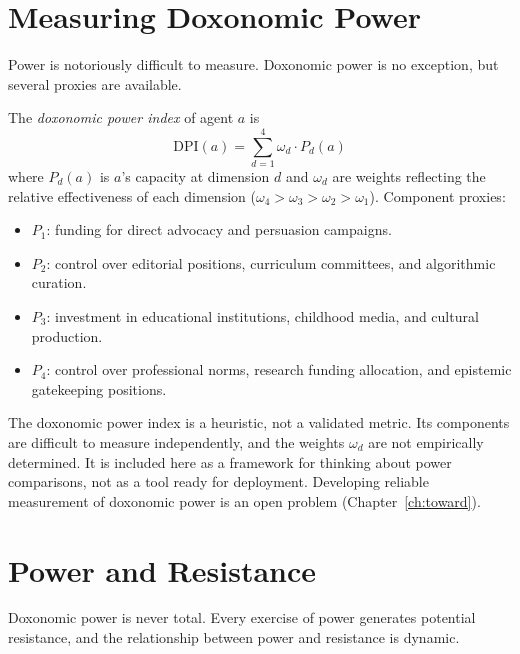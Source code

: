 \section{Measuring Doxonomic Power}
\label{sec:ch9-measuring}

Power is notoriously difficult to measure.
Doxonomic power is no exception, but several proxies are available.

\begin{definition}
\label{def:dpi}
The \emph{doxonomic power index} of agent $a$ is
\[
  \mathrm{DPI}(a) = \sum_{d=1}^{4} \omega_d \cdot P_d(a)
\]
where $P_d(a)$ is $a$'s capacity at dimension $d$ and $\omega_d$ are weights reflecting the relative effectiveness of each dimension ($\omega_4 > \omega_3 > \omega_2 > \omega_1$).
Component proxies:
\begin{itemize}[nosep]
  \item $P_1$: funding for direct advocacy and persuasion campaigns.
  \item $P_2$: control over editorial positions, curriculum committees, and algorithmic curation.
  \item $P_3$: investment in educational institutions, childhood media, and cultural production.
  \item $P_4$: control over professional norms, research funding allocation, and epistemic gatekeeping positions.
\end{itemize}
\end{definition}

\begin{remark}
The doxonomic power index is a heuristic, not a validated metric.
Its components are difficult to measure independently, and the weights $\omega_d$ are not empirically determined.
It is included here as a framework for thinking about power comparisons, not as a tool ready for deployment.
Developing reliable measurement of doxonomic power is an open problem (Chapter~\ref{ch:toward}).
\end{remark}


\section{Power and Resistance}
\label{sec:ch9-resistance}

Doxonomic power is never total.
Every exercise of power generates potential resistance, and the relationship between power and resistance is dynamic.

